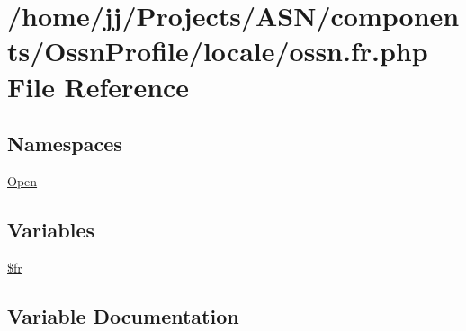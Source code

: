 \hypertarget{components_2_ossn_profile_2locale_2ossn_8fr_8php}{}\section{/home/jj/\+Projects/\+A\+S\+N/components/\+Ossn\+Profile/locale/ossn.fr.\+php File Reference}
\label{components_2_ossn_profile_2locale_2ossn_8fr_8php}
\subsection*{Namespaces}
\begin{DoxyCompactItemize}
\item 
 \hyperlink{namespace_open}{Open}
\end{DoxyCompactItemize}
\subsection*{Variables}
\begin{DoxyCompactItemize}
\item 
\hyperlink{components_2_ossn_profile_2locale_2ossn_8fr_8php_ad5107c697816e7b7f89ad1b3e94e3e0e}{\$fr}
\end{DoxyCompactItemize}


\subsection{Variable Documentation}
